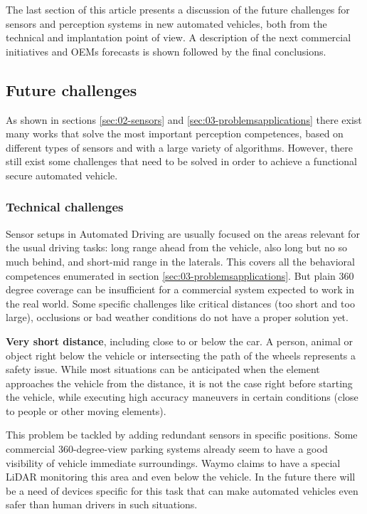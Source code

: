 
The last section of this article presents a discussion of the future challenges 
for sensors and perception systems in new automated vehicles, both from the 
technical and implantation point of view. A description of the next 
commercial initiatives and OEMs forecasts is shown followed by the final 
conclusions.


\subsection{Future challenges}

As shown in sections \ref{sec:02-sensors} and \ref{sec:03-problemsapplications} there exist many works that solve the most important perception competences, based on different types of sensors and with a large variety of algorithms. However, there still exist some challenges that need to be solved in order to achieve a functional secure automated vehicle.

\subsubsection{Technical challenges}

Sensor setups in Automated Driving are usually focused on the areas relevant 
for the usual driving tasks: long range ahead from the vehicle, also long but 
no so much behind, and short-mid range in the laterals. This covers all the 
behavioral competences enumerated in section 
\ref{sec:03-problemsapplications}. 
But plain 360 degree coverage can be insufficient for a commercial system
expected to work in the real world. Some specific challenges like 
critical distances (too short and too large), occlusions or bad weather 
conditions do not have a proper solution yet.

\textbf{Very short distance}, including close to or below the car.
    A person, animal or object right below the vehicle or intersecting 
    the path of the wheels represents a safety issue. While most situations
    can be anticipated when the element approaches the vehicle from the
    distance, it is not the case right before starting the vehicle, 
    while executing high accuracy maneuvers in certain conditions 
    (close to people or other moving elements).  
    
    This problem be tackled by adding redundant sensors in specific positions.
    Some commercial 360-degree-view parking systems \cite{gandhi2006vehicle} 
    already seem to have a good visibility of vehicle immediate surroundings.
    Waymo claims to have a special LiDAR monitoring this area and even below
    the vehicle.         
    In the future there will be a need of devices specific for this task 
    that can make automated vehicles even safer than human drivers in such 
    situations.
      
